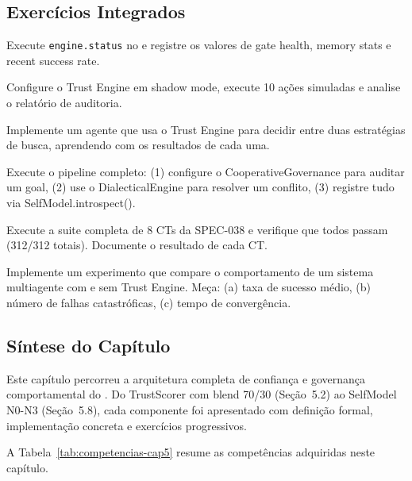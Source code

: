 \subsection{Exercícios Integrados}

\begin{exercicio}[Nivel 0]
Execute \lstinline{engine.status} no \opencodeeco{} e registre os
valores de gate health, memory stats e recent success rate.
\end{exercicio}
\begin{exercicio}
Configure o Trust Engine em shadow mode, execute 10 ações simuladas
e analise o relatório de auditoria.
\end{exercicio}
\begin{exercicio}
Implemente um agente que usa o Trust Engine para decidir entre duas
estratégias de busca, aprendendo com os resultados de cada uma.
\end{exercicio}
\begin{exercicio}
Execute o pipeline completo: (1) configure o CooperativeGovernance
para auditar um goal, (2) use o DialecticalEngine para resolver um
conflito, (3) registre tudo via SelfModel.introspect().
\end{exercicio}
\begin{exercicio}
Execute a suite completa de 8 CTs da SPEC-038 e verifique que todos
passam (312/312 totais). Documente o resultado de cada CT.
\end{exercicio}
\begin{exercicio}
Implemente um experimento que compare o comportamento de um sistema
multiagente com e sem Trust Engine. Meça: (a) taxa de sucesso médio,
(b) número de falhas catastróficas, (c) tempo de convergência.
\end{exercicio}

\subsection{Síntese do Capítulo}

Este capítulo percorreu a arquitetura completa de confiança e
governança comportamental do \opencodeeco{}. Do TrustScorer com
blend 70/30 (Seção~5.2) ao SelfModel N0-N3 (Seção~5.8), cada
componente foi apresentado com definição formal, implementação
concreta e exercícios progressivos.

A Tabela~\ref{tab:competencias-cap5} resume as competências
adquiridas neste capítulo.

